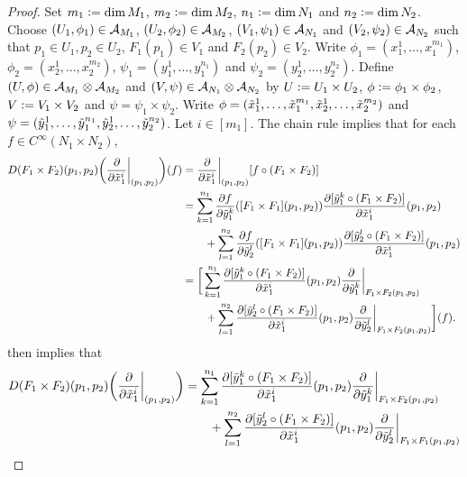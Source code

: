 \documentclass{book}
\begin{document}
	\begin{proof}
		Set $m_1 \vcentcolon= \dim M_1$, $m_2 \vcentcolon= \dim M_2$, $n_1 \vcentcolon= \dim N_1$ and $n_2 \vcentcolon= \dim N_2$. Choose $(U_1, \phi_1) \in \mathcal{A}_{M_1}$, $(U_2, \phi_2) \in \mathcal{A}_{M_2}$, $(V_1, \psi_1) \in \mathcal{A}_{N_1}$ and $(V_2, \psi_2) \in \mathcal{A}_{N_2}$ such that $p_1 \in U_1, p_2 \in U_2$, $F_1(p_1) \in V_1$ and $F_2(p_2) \in V_2$. Write $\phi_1 = (x^1_1, \ldots, x^{m_1}_1)$, $\phi_2 = (x^1_2, \ldots, x^{m_2}_2)$, $\psi_1 = (y^1_1, \ldots, y^{n_1}_1)$ and $\psi_2 = (y^1_2, \ldots, y^{n_2}_2)$. Define $(U, \phi) \in \mathcal{A}_{M_1} \otimes \mathcal{A}_{M_2}$ and $(V, \psi) \in \mathcal{A}_{N_1} \otimes \mathcal{A}_{N_2}$ by $U \vcentcolon= U_1 \times U_2$, $\phi \vcentcolon= \phi_1 \times \phi_2$, $V \vcentcolon= V_1 \times V_2$ and $\psi = \psi_1 \times \psi_2$. Write $\phi = (\tilde{x}^1_1, \ldots, \tilde{x}^{m_1}_1, \tilde{x}^1_2, \ldots, \tilde{x}^{m_2}_2)$ and $\psi = (\tilde{y}^1_1, \ldots, \tilde{y}^{n_1}_1, \tilde{y}^1_2, \ldots, \tilde{y}^{n_2}_2)$. Let $i \in [m_1]$. The chain rule implies that for each $f \in C^{\infty}(N_1 \times N_2)$, 
		\begin{align*}
			D(F_1 \times F_2)(p_1, p_2) \bigg( \frac{\partial}{\partial \tilde{x}_1^i} \bigg|_{(p_1, p_2)} \bigg)(f) 
			& = \frac{\partial}{\partial \tilde{x}^i_1} \bigg|_{(p_1, p_2)} [f \circ (F_1 \times F_2)] \\
			& = \sum_{k=1}^{n_1} \frac{\partial f}{\partial \tilde{y}^k_1}([F_1 \times F_1] (p_1, p_2)) \frac{\partial [\tilde{y}^k_1 \circ (F_1 \times F_2)]}{\partial \tilde{x}^i_1}(p_1, p_2) \\
			& \quad \quad + \sum_{l=1}^{n_2} \frac{\partial f}{\partial \tilde{y}^l_2}([F_1 \times F_1] (p_1, p_2)) \frac{\partial [\tilde{y}^l_2 \circ (F_1 \times F_2)]}{\partial \tilde{x}^i_1}(p_1, p_2) \\
			& = \bigg[ \sum_{k=1}^{n_1} \frac{\partial [\tilde{y}^k_1 \circ (F_1 \times F_2)]}{\partial \tilde{x}^i_1}(p_1, p_2) \frac{\partial }{\partial \tilde{y}^k_1} \bigg|_{F_1 \times F_2 (p_1, p_2)}  \\
			& \quad \quad + \sum_{l=1}^{n_2} \frac{\partial [\tilde{y}^l_2 \circ (F_1 \times F_2)]}{\partial \tilde{x}^i_1}(p_1, p_2) \frac{\partial }{\partial \tilde{y}^l_2} \bigg|_{F_1 \times F_2 (p_1, p_2)} \bigg] (f).
		\end{align*}
		 then implies that 
		\begin{align*}
			D(F_1 \times F_2)(p_1, p_2) \bigg( \frac{\p}{\p \tl{x}_1^i} \bigg|_{(p_1, p_2)} \bigg) 
			& = \sum_{k=1}^{n_1} \frac{\p [\tl{y}^k_1 \circ (F_1 \times F_2)]}{\p \tl{x}^i_1}(p_1, p_2) \frac{\p }{\p \tl{y}^k_1} \bigg|_{F_1 \times F_2 (p_1, p_2)} \\
			& \quad \quad + \sum_{l=1}^{n_2} \frac{\p [\tl{y}^l_2 \circ (F_1 \times F_2)]}{\p \tl{x}^i_1}(p_1, p_2) \frac{\p }{\p \tl{y}^l_2} \bigg|_{F_1 \times F_1 (p_1, p_2)} \\

\end{align*}
\end{proof}
\end{document}
